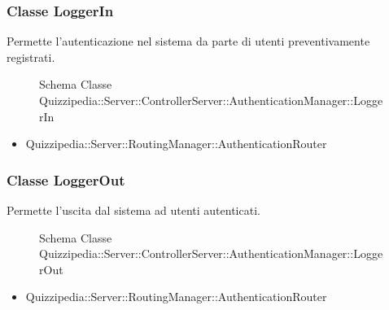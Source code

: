 \subsubsection{Classe LoggerIn}
Permette l'autenticazione nel sistema da parte di utenti preventivamente registrati.
\begin{figure}[H]
\centering
\noindent{}
\caption{Schema Classe Quizzipedia::Server::ControllerServer::AuthenticationManager::LoggerIn}
\end{figure}
\begin{itemize}
\item Quizzipedia::Server::RoutingManager::AuthenticationRouter
\end{itemize}
\subsubsection{Classe LoggerOut}
Permette l'uscita dal sistema ad utenti autenticati.
\begin{figure}[H]
\centering
\noindent{}
\caption{Schema Classe Quizzipedia::Server::ControllerServer::AuthenticationManager::LoggerOut}
\end{figure}
\begin{itemize}
\item Quizzipedia::Server::RoutingManager::AuthenticationRouter
\end{itemize}
